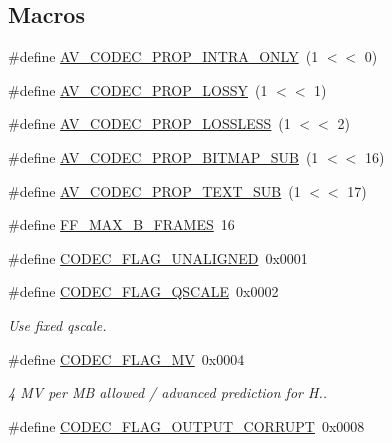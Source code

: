\subsection*{Macros}
\begin{DoxyCompactItemize}
\item 
\#define \hyperlink{group__lavc__core_ga70552a7d4d1803bc11be8e6c74529d24}{A\+V\+\_\+\+C\+O\+D\+E\+C\+\_\+\+P\+R\+O\+P\+\_\+\+I\+N\+T\+R\+A\+\_\+\+O\+N\+LY}~(1 $<$$<$ 0)
\item 
\#define \hyperlink{group__lavc__core_ga0bb6cb9b395a0f2345eb41ed990fbf9f}{A\+V\+\_\+\+C\+O\+D\+E\+C\+\_\+\+P\+R\+O\+P\+\_\+\+L\+O\+S\+SY}~(1 $<$$<$ 1)
\item 
\#define \hyperlink{group__lavc__core_ga540358327f77f6b924ca25a712b7fdc1}{A\+V\+\_\+\+C\+O\+D\+E\+C\+\_\+\+P\+R\+O\+P\+\_\+\+L\+O\+S\+S\+L\+E\+SS}~(1 $<$$<$ 2)
\item 
\#define \hyperlink{group__lavc__core_gac0dfb59ee63132c9a064696a741419f6}{A\+V\+\_\+\+C\+O\+D\+E\+C\+\_\+\+P\+R\+O\+P\+\_\+\+B\+I\+T\+M\+A\+P\+\_\+\+S\+UB}~(1 $<$$<$ 16)
\item 
\#define \hyperlink{group__lavc__core_gae1c276095faaece7c097f8fd9f1184db}{A\+V\+\_\+\+C\+O\+D\+E\+C\+\_\+\+P\+R\+O\+P\+\_\+\+T\+E\+X\+T\+\_\+\+S\+UB}~(1 $<$$<$ 17)
\item 
\#define \hyperlink{group__lavc__core_gafe5eaf646b3390c6ae8a7a66cd4b7896}{F\+F\+\_\+\+M\+A\+X\+\_\+\+B\+\_\+\+F\+R\+A\+M\+ES}~16
\item 
\#define \hyperlink{group__lavc__core_gaa01127e1e57cc0fc118648e551974043}{C\+O\+D\+E\+C\+\_\+\+F\+L\+A\+G\+\_\+\+U\+N\+A\+L\+I\+G\+N\+ED}~0x0001
\item 
\#define \hyperlink{group__lavc__core_gab743ec1092ea932e7964f7753d223bee}{C\+O\+D\+E\+C\+\_\+\+F\+L\+A\+G\+\_\+\+Q\+S\+C\+A\+LE}~0x0002
\begin{DoxyCompactList}\small\item\em Use fixed qscale. \end{DoxyCompactList}\item 
\#define \hyperlink{group__lavc__core_ga4acbdb36d2e13cb52793a585a22054dc}{C\+O\+D\+E\+C\+\_\+\+F\+L\+A\+G\+\_\+MV}~0x0004
\begin{DoxyCompactList}\small\item\em 4 MV per MB allowed / advanced prediction for H.. \end{DoxyCompactList}\item 
\#define \hyperlink{group__lavc__core_ga9a722d4cebcca23c176a445ada262bb1}{C\+O\+D\+E\+C\+\_\+\+F\+L\+A\+G\+\_\+\+O\+U\+T\+P\+U\+T\+\_\+\+C\+O\+R\+R\+U\+PT}~0x0008
$$
\end{DoxyCompactItemize}
